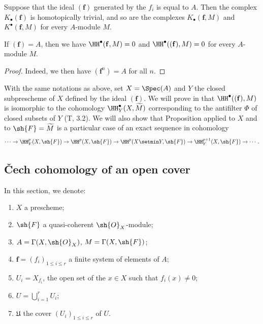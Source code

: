 \begin{proposition}[1.1.8]
\label{III.1.1.8}
Suppose that the ideal $(\mathbf{f})$ generated by the $f_i$ is equal to $A$.
Then the complex $K_\bullet(\mathbf{f})$ is homotopically trivial, and so are the complexes $K_\bullet(\mathbf{f},M)$ and $K^\bullet(\mathbf{f},M)$ for every $A$-module $M$.
\end{proposition}

\begin{corollary}[1.1.9]
\label{III.1.1.9}
If $(\mathbf{f})=A$, then we have $\HH^\bullet(\mathbf{f},M)=0$ and $\HH^\bullet((\mathbf{f}),M)=0$ for every $A$-module $M$.
\end{corollary}

\begin{proof}
Indeed, we then have $(\mathbf{f}^n)=A$ for all $n$.
\end{proof}

\begin{remark}[1.1.10]
\label{III.1.1.10}
With the same notations as above, set $X=\Spec(A)$ and $Y$ the closed subprescheme of $X$ defined by the ideal $(\mathbf{f})$.
We will prove in  that $\HH^\bullet((\mathbf{f}),M)$ is isomorphic to the cohomology $\HH_Y^\bullet(X,\widetilde{M})$ corresponding to the antifilter $\Phi$ of closed subsets of $Y$ (T, 3.2).
We will also show that Proposition  applied to $X$ and to $\sh{F}=\widetilde{M}$ is a particular case of an exact sequence in cohomology
\[
  \cdots\to\HH_Y^p(X,\sh{F})\to\HH^p(X,\sh{F})\to\HH^p(X\setmin Y,\sh{F})\to\HH_Y^{p+1}(X,\sh{F})\to\cdots.
\]
\end{remark}

\subsection{\v Cech cohomology of an open cover}
\label{subsection:III.1.2}

\begin{notation}[1.2.1]
\label{III.1.2.1}
In this section, we denote:
\begin{enumerate}
  \item $X$ a prescheme;
  \item $\sh{F}$ a quasi-coherent $\sh{O}_X$-module;
  \item $A=\Gamma(X,\sh{O}_X)$, $M=\Gamma(X,\sh{F})$;
  \item $\mathbf{f}=(f_i)_{1\leq i\leq r}$ a finite system of elements of $A$;
  \item $U_i=X_{f_i}$, the open set  of the $x\in X$ such that $f_i(x)\neq 0$;
  \item $U=\bigcup_{i=1}^r U_i$;
  \item $\mathfrak{U}$ the cover $(U_i)_{1\leq i\leq r}$ of $U$.
\end{enumerate}
\end{notation}

